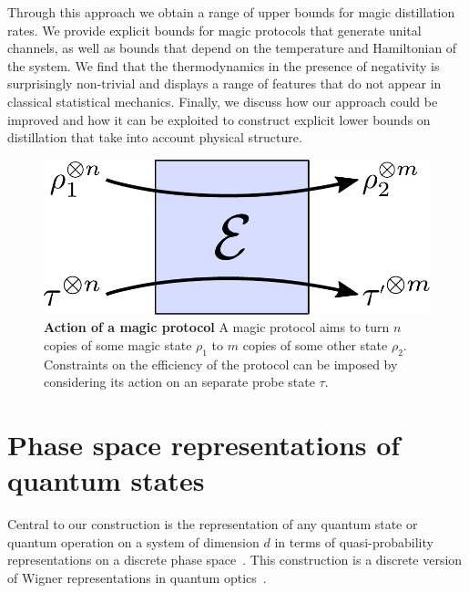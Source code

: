 \documentclass[pra,
aps,
twocolumn,
superscriptaddress,
groupedaddress,
nofootinbib,
reprint
]{revtex4-1}
\begin{document}
Through this approach we obtain a range of upper bounds for magic distillation rates. We provide explicit bounds for magic protocols that generate unital channels, as well as bounds that depend on the temperature and Hamiltonian of the system. We find that the thermodynamics in the presence of negativity is surprisingly non-trivial and displays a range of features that do not appear in classical statistical mechanics. 
Finally, we discuss how our approach could be improved and how it can be exploited to construct explicit lower bounds on distillation that take into account physical structure.

\begin{figure}[t]
    \centering
        \includegraphics[scale=0.4]{figs/protocol_diagram.pdf}
    \caption{\textbf{Action of a magic protocol} 
	A magic protocol aims to turn $n$ copies of some magic state $\rho_1$ to $m$ copies of some other state $\rho_2$.
	Constraints on the efficiency of the protocol can be imposed by considering its action on an separate probe state $\tau$.
    }
    \label{fig:zoo}
\end{figure}

\section{Phase space representations of quantum states}
\label{sec:ps}

Central to our construction is the representation of any quantum state or quantum operation on a system of dimension $d$ in terms of quasi-probability representations on a discrete phase space~\cite{Ferrie_2008}. This construction is a discrete version of Wigner representations in quantum optics~\cite{Wigner_1932, Vourdas_2004}.
\end{document}
